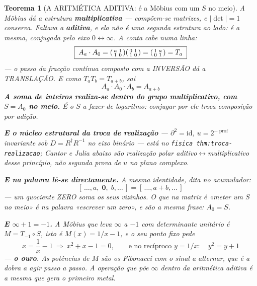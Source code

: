 \documentclass[11pt,a4paper]{article}
\newtheorem{teorema}{Teorema}
\newcommand{\code}[1]{\texttt{\small #1}}
\newcommand{\abs}[1]{\lvert #1\rvert}
\begin{document}
\begin{teorema}[A ARITMÉTICA ADITIVA: é a Möbius com um $S$ no meio]\label{thm:aditiva}
A Möbius dá a estrutura \textbf{multiplicativa} --- compõem-se matrizes, e $\abs{\det}=1$
conserva. Faltava a \textbf{aditiva}, e ela não é uma segunda estrutura ao lado: é a
mesma, conjugada pelo eixo $0\leftrightarrow\infty$. A conta cabe numa linha:
\[
\boxed{\;A_a\cdot A_0=\begin{psmallmatrix}a&1\\1&0\end{psmallmatrix}
\begin{psmallmatrix}0&1\\1&0\end{psmallmatrix}
=\begin{psmallmatrix}1&a\\0&1\end{psmallmatrix}=T_a\;}
\]
--- \emph{o passo da fracção contínua composto com a INVERSÃO dá a TRANSLAÇÃO}. E como
$T_aT_b=T_{a+b}$, sai
\[
\boxed{\;A_a\cdot A_0\cdot A_b=A_{a+b}\;}
\]
\textbf{A soma de inteiros realiza-se dentro do grupo multiplicativo, com $S=A_0$ no
meio.} É o $S$ a fazer de logaritmo: conjugar por ele troca composição por adição.

\medskip\noindent\textbf{E o núcleo estrutural da troca de realização} ---
$\partial^{2}=\mathrm{id}$, $u=2^{-\operatorname{prof}}$ invariante sob
$D=R^{\dagger}R^{-1}$ no eixo binário --- \emph{está} no
\code{fisica thm:troca-realizacao}; Cantor e Julia \emph{abaixo} são realização
polar aditivo$\leftrightarrow$multiplicativo desse princípio, não segunda prova
de $u$ no plano complexo.

\medskip\noindent\textbf{E na palavra lê-se directamente.} A mesma identidade, dita no acumulador:
\[
\boxed{\;[\,\ldots,a,\;\mathbf{0},\;b,\ldots\,]=[\,\ldots,a+b,\ldots\,]\;}
\]
--- \emph{um quociente ZERO soma os seus vizinhos}. O que na matriz é «meter um $S$ no
meio» é na palavra «escrever um zero», e são a mesma frase: $A_0=S$.

\medskip
\noindent\textbf{E $\infty+1=-1$.} A Möbius que leva $\infty$ a $-1$ com determinante
unitário é $M=T_{-1}\circ S$, isto é $M(x)=1/x-1$, e o seu ponto fixo pede
\[
x=\frac1x-1\ \Longrightarrow\ x^{2}+x-1=0,
\qquad\text{e no recíproco } y=1/x:\quad y^{2}=y+1
\]
--- \textbf{o ouro}. As potências de $M$ são os Fibonacci com o sinal a alternar, que é
a dobra a agir passo a passo. \emph{A operação que põe $\infty$ dentro da aritmética
aditiva é a mesma que gera o primeiro metal.}


\end{teorema}
\end{document}
